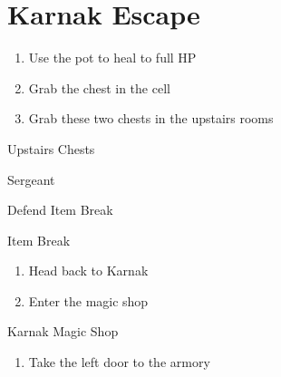 \chapter{Karnak Escape}

\vspace{\baselineskip}

\begin{paracol}{2}

\begin{enumerate}
    \item Use the pot to heal to full HP
    \item Grab the  chest in the cell
    \item Grab these two  chests in the upstairs rooms
\end{enumerate}

\switchcolumn
\begin{misc}{Upstairs Chests}
\end{misc}

\switchcolumn
\begin{boss}{Sergeant}
    \varwb
    \begin{round}{1}
        \bartz Defend
        \faris Item \then {} \then Break
        \item {}
        \lenna Item \then \battleGroup{\iceRod} \then Break
    \end{round}
    \varwe
\end{boss}

\begin{enumerate}[resume]
    \item Head back to Karnak
    \item Enter the magic shop
\end{enumerate}

\begin{shop}{Karnak Magic Shop}
    \varwb
    \begin{buy}
        \item {} \life
    \end{buy}
    \varwe
\end{shop}

\begin{enumerate}[resume]
    \item Take the left door to the armory
\end{enumerate}


\end{paracol}
